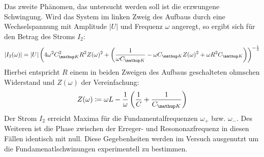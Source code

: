 Das zweite Phänomen, das untersucht werden soll ist die erzwungene Schwingung.
Wird das System im linken Zweig des Aufbaus durch eine Wechselspannung mit Amplitude $\left| U \right|$ und Frequenz $\omega$ angeregt, so ergibt sich für den Betrag des
Stroms $I_2$:
\begin{equation}
|I_2(\omega)| = |U| \left( 4 \omega^2 C\ua{K}^2 R^2 Z(\omega )^2 + \left(\frac{1}{\omega C\ua{K}} - \omega C\ua{K} Z(\omega )^2 + \omega R^2 C\ua{K}\right)\right)^{-\frac{1}{2}}
\label{eq: I_2(omega)}
\end{equation}
Hierbei entspricht $R$ einem in beiden Zweigen des Aufbaus geschalteten ohmschen Widerstand und $Z(\omega)$ der Vereinfachung:
\begin{equation}
  Z(\omega ) \coloneqq \omega L - \frac{1}{\omega } \left(\frac{1}{C} + \frac{1}{C\ua{K}}\right)
\end{equation}
Der Strom $I_2$ erreicht Maxima für die Fundamentalfrequenzen $\omega_+$ bzw. $\omega_-$. Des Weiteren ist die Phase zwischen der Erreger-
und Resononazfrequenz in diesen Fällen identisch mit null. Diese Gegebenheiten werden im Versuch ausgenutzt um
die Fundamenatlschwinungen experimentell zu bestimmen.
